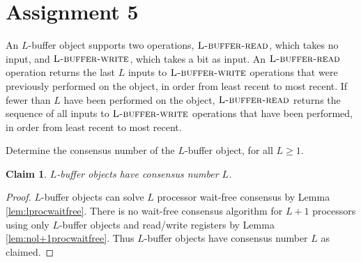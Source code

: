 \documentclass[11pt]{article}
\newcommand\lbufread{\textsc{L-buffer-read}}
\newcommand\lbufwrite{\textsc{L-buffer-write}}
\newtheorem{claim}[theorem]{Claim}
\begin{document}
\rhead{\today}

\section*{Assignment 5}
An $L$-buffer object supports two operations, $\lbufread$, which takes no input, and $\lbufwrite$, which takes a bit as input. An $\lbufread$ operation returns the last $L$ inputs to $\lbufwrite$ operations that were previously performed on the object, in order from least recent to most recent. If fewer than $L$ have been performed on the object, $\lbufread$ returns the sequence of all inputs to $\lbufwrite$ operations that have been performed, in order from least recent to most recent.

Determine the consensus number of the $L$-buffer object, for all $L \geq 1$.

\begin{claim}
$L$-buffer objects have consensus number $L$.
\end{claim}
\begin{proof}
$L$-buffer objects can solve $L$ processor wait-free consensus by Lemma \ref{lem:lprocwaitfree}. There is no wait-free consensus algorithm for $L+1$ processors using only $L$-buffer objects and read/write registers by Lemma \ref{lem:nol+1procwaitfree}. Thus $L$-buffer objects have consensus number $L$ as claimed. 
\end{proof}
\end{document}
